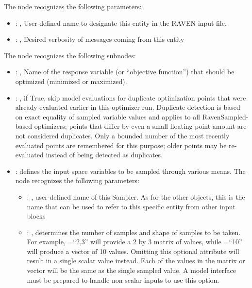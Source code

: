   The  node recognizes the following parameters:
    \begin{itemize}
      \item {}: ,
        User-defined name to designate this entity in the RAVEN input file.
      \item {}: ,
        Desired verbosity of messages coming from this entity
  \end{itemize}

  The  node recognizes the following subnodes:
  \begin{itemize}
    \item {}: ,
      Name of the response variable (or ``objective function'') that should be optimized
      (minimized or maximized).

    \item {}: ,
      if True, skip model evaluations for duplicate optimization points that were already
      evaluated earlier in this optimizer run. Duplicate detection is based on exact equality of
      sampled variable values and applies to all RavenSampled-based optimizers; points that differ
      by even a small floating-point amount are not considered duplicates. Only a bounded number
      of the most recently evaluated points are remembered for this purpose; older points may be
      re-evaluated instead of being detected as duplicates. 

    \item {}:
      defines the input space variables to be sampled through various means.
      The  node recognizes the following parameters:
        \begin{itemize}
          \item {}: ,
            user-defined name of this Sampler. \nb As for the other objects,               this is
            the name that can be used to refer to this specific entity from other input blocks
          \item {}: ,
            determines the number of samples and shape of samples               to be taken.  For
            example, =``2,3'' will provide a 2 by 3               matrix of values,
            while =``10'' will produce a vector of 10 values.               Omitting
            this optional attribute will result in a single scalar value instead.               Each
            of the values in the matrix or vector will be the same as the single sampled value.
            \nb A model interface must be prepared to handle non-scalar inputs to use this option.
      \end{itemize}


\end{itemize}
